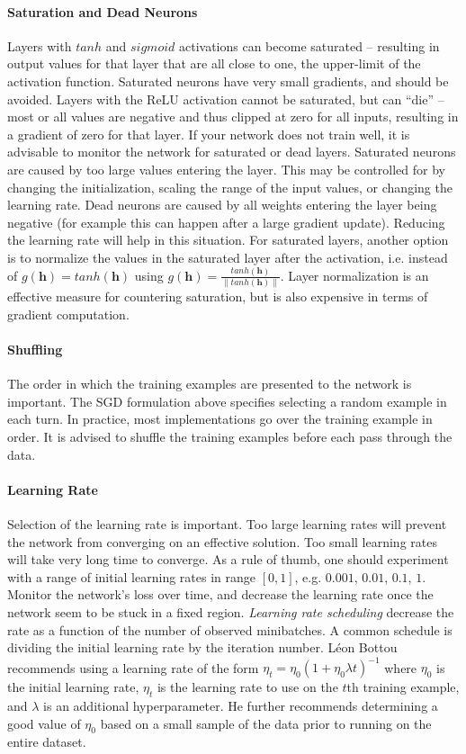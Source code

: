 \documentclass[jair,twoside,11pt,theapa]{article}
\newcommand{\m}[1]{\mathbf{#1}}%
\renewcommand{\shortcite}[0]{\citeyear}
\begin{document}
{\paragraph{Saturation and Dead Neurons}  Layers with $tanh$ and $sigmoid$ activations can
become saturated -- resulting in output values for that layer that are all close to one,
the upper-limit
of the activation function. Saturated neurons have very small gradients, and
should be avoided.
Layers with the ReLU activation cannot be saturated, but can ``die'' -- most or
all values are negative and thus clipped at zero for all inputs, resulting in a
gradient of zero for that layer.  
If your network does not train well, it is advisable to monitor the network for
saturated or dead layers. Saturated neurons are caused by
too large values entering the layer.  This may be controlled for by changing the
initialization, scaling the range of the input values, or changing the learning
rate.
Dead neurons are caused by all weights entering the layer being
negative (for example this can happen after a large gradient update). Reducing
the learning rate will help in this situation.
For saturated layers, another option is to normalize the values in the saturated
layer after the activation, i.e. instead of $g(\m{h})=tanh(\m{h})$ using
$g(\m{h})=\frac{tanh(\m{h})}{\|tanh(\m{h})\|}$.
Layer normalization is an effective measure for countering saturation, but is also expensive in
terms of gradient computation. 

\paragraph{Shuffling} The order in which the training examples are presented to
the network is important. The SGD formulation above specifies selecting a random
example in each turn. In practice, most implementations go over the training example
in order.
It is advised to shuffle the training examples before
each pass through the data.

\paragraph{Learning Rate} Selection of the learning rate is important. Too large
learning rates will prevent the network from converging on an effective
solution.  Too small learning rates will take very long time to converge.  As a
rule of thumb, one should experiment with a range of initial learning rates in
range $[0, 1]$, e.g. $0.001$, $0.01$, $0.1$, $1$.  Monitor the network's loss
over time, and decrease the learning rate once the network seem to be stuck in a
fixed region.  \emph{Learning rate scheduling} decrease the rate as a function
of the number of observed minibatches.
A common schedule is dividing the initial learning rate by the iteration
number.  L\'eon Bottou \shortcite{bottou2012stochastic} recommends using a
learning rate of the form $\eta_t = \eta_0(1+\eta_0\lambda t)^{-1}$ where
$\eta_0$ is the initial learning rate, $\eta_t$ is the learning rate to use on
the $t$th training example, and $\lambda$ is an additional hyperparameter.  He
further recommends determining a good value of $\eta_0$ based on a small sample of
the data prior to running on the entire dataset.

}
\end{document}

